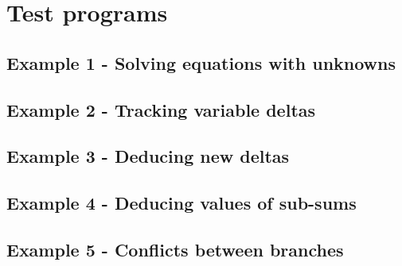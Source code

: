 \newpage
\clearpage
\section*{Test programs}
\subsection*{Example 1 - Solving equations with unknowns}
\newpage
\clearpage
\subsection*{Example 2 - Tracking variable deltas}
\newpage
\clearpage
\subsection*{Example 3 - Deducing new deltas}
\newpage
\clearpage
\subsection*{Example 4 - Deducing values of sub-sums}
\newpage
\clearpage
\subsection*{Example 5 - Conflicts between branches}
